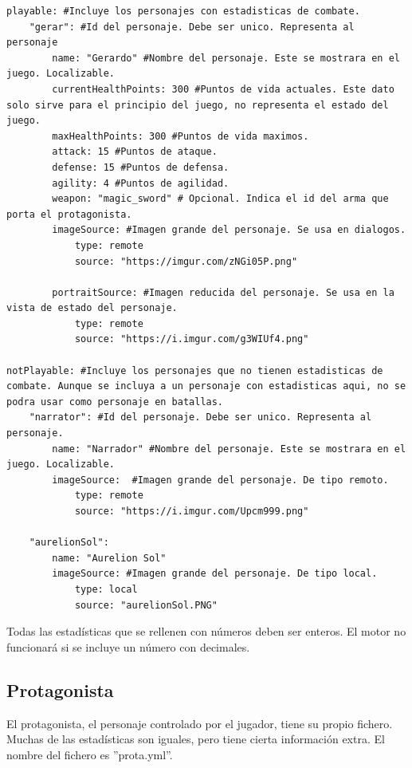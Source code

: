 \begin{lstlisting}
playable: #Incluye los personajes con estadisticas de combate.
	"gerar": #Id del personaje. Debe ser unico. Representa al personaje
		name: "Gerardo" #Nombre del personaje. Este se mostrara en el juego. Localizable.
		currentHealthPoints: 300 #Puntos de vida actuales. Este dato solo sirve para el principio del juego, no representa el estado del juego.
		maxHealthPoints: 300 #Puntos de vida maximos.
		attack: 15 #Puntos de ataque.
		defense: 15 #Puntos de defensa.
		agility: 4 #Puntos de agilidad.
		weapon: "magic_sword" # Opcional. Indica el id del arma que porta el protagonista.
		imageSource: #Imagen grande del personaje. Se usa en dialogos.
			type: remote
			source: "https://imgur.com/zNGi05P.png"

		portraitSource: #Imagen reducida del personaje. Se usa en la vista de estado del personaje.
			type: remote
			source: "https://i.imgur.com/g3WIUf4.png"

notPlayable: #Incluye los personajes que no tienen estadisticas de combate. Aunque se incluya a un personaje con estadisticas aqui, no se podra usar como personaje en batallas.
	"narrator": #Id del personaje. Debe ser unico. Representa al personaje.
		name: "Narrador" #Nombre del personaje. Este se mostrara en el juego. Localizable.
		imageSource:  #Imagen grande del personaje. De tipo remoto.
			type: remote
			source: "https://i.imgur.com/Upcm999.png"

	"aurelionSol":
		name: "Aurelion Sol"
		imageSource: #Imagen grande del personaje. De tipo local.
			type: local
			source: "aurelionSol.PNG"
\end{lstlisting}

Todas las estadísticas que se rellenen con números deben ser enteros. El motor no funcionará si se incluye un número con decimales.

\subsection{Protagonista}
El protagonista, el personaje controlado por el jugador, tiene su propio fichero. Muchas de las estadísticas son iguales, pero tiene cierta información extra. El nombre del fichero es ''prota.yml''.

